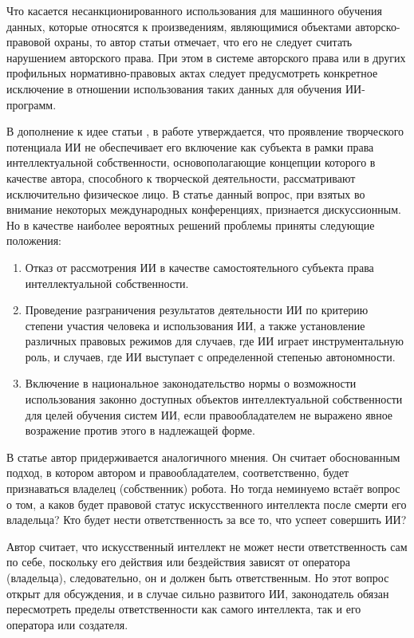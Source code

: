 Что касается несанкционированного использования для машинного обучения данных, которые относятся к произведениям, являющимися
объектами авторско-правовой охраны, то автор статьи \cite{II} отмечает, что его не следует считать нарушением
авторского права. При этом в системе авторского права или в других профильных нормативно-правовых актах
следует предусмотреть конкретное исключение в отношении использования таких данных для обучения ИИ-программ.

В дополнение к идее статьи \cite{II}, в работе \cite{chel} утверждается, что
проявление творческого потенциала ИИ не обеспечивает его включение как субъекта в рамки
права интеллектуальной собственности, основополагающие концепции которого в качестве автора,
способного к творческой деятельности, рассматривают исключительно физическое лицо. В статье
\cite{chel} данный вопрос, при взятых во внимание некоторых международных конференциях,
признается дискуссионным. Но в качестве наиболее вероятных решений проблемы приняты следующие положения:

\begin{enumerate}
\item Отказ от рассмотрения ИИ в качестве самостоятельного субъекта права интеллектуальной собственности.
\item Проведение разграничения результатов деятельности ИИ по критерию степени участия человека и
использования ИИ, а также установление различных правовых режимов для случаев, где ИИ играет
инструментальную роль, и случаев, где ИИ выступает с определенной степенью автономности.
\item Включение в национальное законодательство нормы о возможности использования законно
доступных объектов интеллектуальной собственности для целей обучения систем ИИ, если
правообладателем не выражено явное возражение против этого в надлежащей форме.
\end{enumerate}

В статье \cite{probs} автор придерживается аналогичного мнения. Он считает
обоснованным подход, в котором автором и правообладателем, соответственно,
будет признаваться владелец (собственник) робота. Но тогда неминуемо встаёт вопрос о том,
а каков будет правовой статус искусственного интеллекта после смерти его владельца?
Кто будет нести ответственность за все то, что успеет совершить ИИ?

Автор считает, что
искусственный интеллект не может нести ответственность сам по себе, поскольку его действия
или бездействия зависят от оператора (владельца), следовательно, он и
должен быть ответственным. Но этот вопрос открыт для обсуждения, и в
случае сильно развитого ИИ, законодатель обязан пересмотреть пределы ответственности
как самого интеллекта, так и его оператора или создателя.

